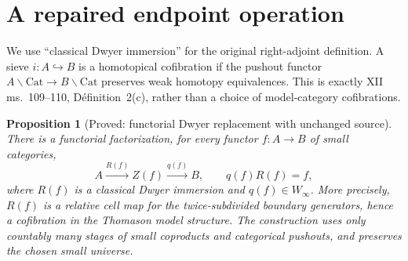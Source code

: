 \documentclass[11pt,a4paper]{article}
\newtheorem{proposition}[theorem]{Proposition}
\theoremstyle{definition}
\theoremstyle{remark}
\begin{document}

\section{A repaired endpoint operation}



We use ``classical Dwyer immersion'' for the original right-adjoint definition. A sieve $i:A\hookrightarrow B$ is a homotopical cofibration if the pushout functor $A\backslash\mathrm{Cat}\to B\backslash\mathrm{Cat}$ preserves weak homotopy equivalences. This is exactly XII ms.~109--110, D\'efinition~2(c), rather than a choice of model-category cofibrations.

\begin{proposition}[Proved: functorial Dwyer replacement with unchanged source]\label{D:dwyer-replacement}
There is a functorial factorization, for every functor $f:A\to B$ of small categories,
\[
 A\xrightarrow{R(f)}Z(f)\xrightarrow{q(f)}B,
 \qquad q(f)R(f)=f,
\]
where $R(f)$ is a classical Dwyer immersion and $q(f)\in W_\infty$. More precisely, $R(f)$ is a relative cell map for the twice-subdivided boundary generators, hence a cofibration in the Thomason model structure. The construction uses only countably many stages of small coproducts and categorical pushouts, and preserves the chosen small universe.
\end{proposition}
\end{document}
